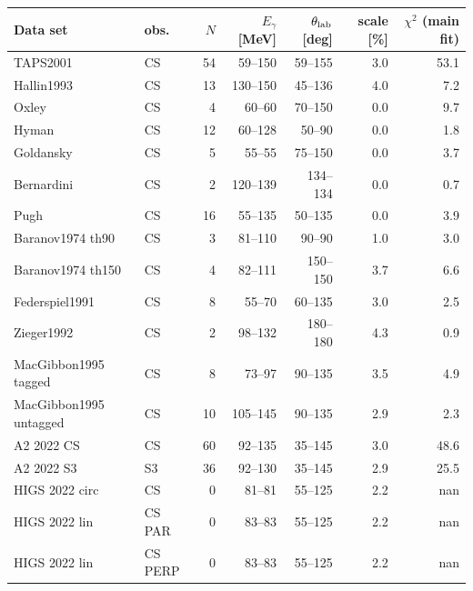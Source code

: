 \begin{tabular}{llrrrrr}
\hline
Data set & obs. & $N$ & $E_\gamma$ [MeV] & $\theta_{\rm lab}$ [deg] & scale [\%] & $\chi^2$ (main fit)\\\hline
TAPS2001 \cite{OlmosdeLeon:2001zn} & CS & 54 & 59--150 & 59--155 & 3.0 & 53.1\\
Hallin1993 \cite{Hallin:1993ft} & CS & 13 & 130--150 & 45--136 & 4.0 & 7.2\\
Oxley \cite{Oxley:1958zz} & CS & 4 & 60--60 & 70--150 & 0.0 & 9.7\\
Hyman \cite{Hyman:1959zz} & CS & 12 & 60--128 & 50--90 & 0.0 & 1.8\\
Goldansky \cite{Goldansky:1960zz} & CS & 5 & 55--55 & 75--150 & 0.0 & 3.7\\
Bernardini \cite{Bernardini:1960wya} & CS & 2 & 120--139 & 134--134 & 0.0 & 0.7\\
Pugh \cite{Pugh:1957zz} & CS & 16 & 55--135 & 50--135 & 0.0 & 3.9\\
Baranov1974 th90 \cite{Baranov:1974ec} & CS & 3 & 81--110 & 90--90 & 1.0 & 3.0\\
Baranov1974 th150 \cite{Baranov:1974ec} & CS & 4 & 82--111 & 150--150 & 3.7 & 6.6\\
Federspiel1991 \cite{Federspiel:1991yd} & CS & 8 & 55--70 & 60--135 & 3.0 & 2.5\\
Zieger1992 \cite{Zieger:1992jq} & CS & 2 & 98--132 & 180--180 & 4.3 & 0.9\\
MacGibbon1995 tagged \cite{MacGibbon:1995in} & CS & 8 & 73--97 & 90--135 & 3.5 & 4.9\\
MacGibbon1995 untagged \cite{MacGibbon:1995in} & CS & 10 & 105--145 & 90--135 & 2.9 & 2.3\\
A2 2022 CS \cite{A2:2021wmm} & CS & 60 & 92--135 & 35--145 & 3.0 & 48.6\\
A2 2022 S3 \cite{A2:2021wmm} & S3 & 36 & 92--130 & 35--145 & 2.9 & 25.5\\
HIGS 2022 circ \cite{Li:2022vnz} & CS & 0 & 81--81 & 55--125 & 2.2 & nan\\
HIGS 2022 lin \cite{Li:2022vnz} & CS PAR & 0 & 83--83 & 55--125 & 2.2 & nan\\
HIGS 2022 lin \cite{Li:2022vnz} & CS PERP & 0 & 83--83 & 55--125 & 2.2 & nan\\
\hline
\end{tabular}

